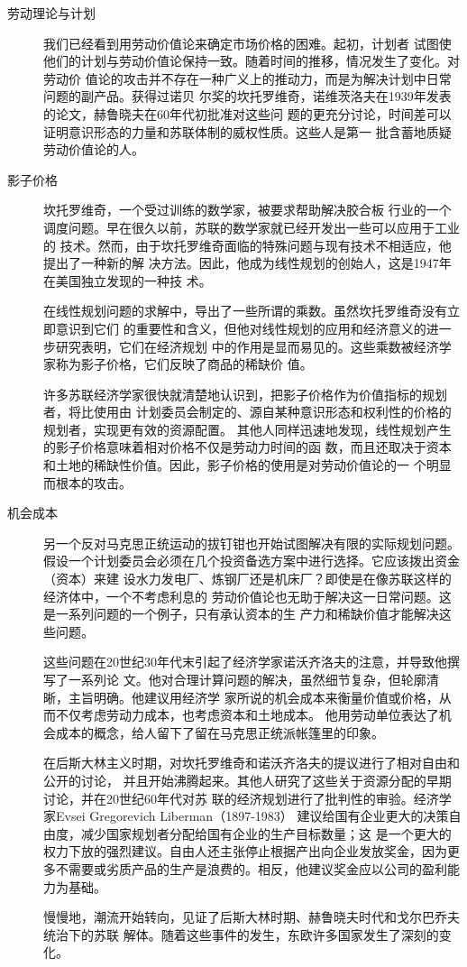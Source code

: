 \begin{description}
\item[劳动理论与计划] 我们已经看到用劳动价值论来确定市场价格的困难。起初，计划者
  试图使他们的计划与劳动价值论保持一致。随着时间的推移，情况发生了变化。对劳动价
  值论的攻击并不存在一种广义上的推动力，而是为解决计划中日常问题的副产品。获得过诺贝
  尔奖的坎托罗维奇，诺维茨洛夫在1939年发表的论文，赫鲁晓夫在60年代初批准对这些问
  题的更充分讨论，时间差可以证明意识形态的力量和苏联体制的威权性质。这些人是第一
  批含蓄地质疑劳动价值论的人。

\item[影子价格] 坎托罗维奇，一个受过训练的数学家，被要求帮助解决胶合板
  行业的一个调度问题。早在很久以前，苏联的数学家就已经开发出一些可以应用于工业的
  技术。然而，由于坎托罗维奇面临的特殊问题与现有技术不相适应，他提出了一种新的解
  决方法。因此，他成为线性规划的创始人，这是1947年在美国独立发现的一种技
  术。

  在线性规划问题的求解中，导出了一些所谓的乘数。虽然坎托罗维奇没有立即意识到它们
  的重要性和含义，但他对线性规划的应用和经济意义的进一步研究表明，它们在经济规划
  中的作用是显而易见的。这些乘数被经济学家称为影子价格，它们反映了商品的稀缺价
  值。

  许多苏联经济学家很快就清楚地认识到，把影子价格作为价值指标的规划者，将比使用由
  计划委员会制定的、源自某种意识形态和权利性的价格的规划者，实现更有效的资源配置。
  其他人同样迅速地发现，线性规划产生的影子价格意味着相对价格不仅是劳动力时间的函
  数，而且还取决于资本和土地的稀缺性价值。因此，影子价格的使用是对劳动价值论的一
  个明显而根本的攻击。

\item[机会成本] 另一个反对马克思正统运动的拔钉钳也开始试图解决有限的实际规划问题。
  假设一个计划委员会必须在几个投资备选方案中进行选择。它应该拨出资金（资本）来建
  设水力发电厂、炼钢厂还是机床厂？即使是在像苏联这样的经济体中，一个不考虑利息的
  劳动价值论也无助于解决这一日常问题。这是一系列问题的一个例子，只有承认资本的生
  产力和稀缺价值才能解决这些问题。

  这些问题在20世纪30年代末引起了经济学家诺沃齐洛夫的注意，并导致他撰写了一系列论
  文。他对合理计算问题的解决，虽然细节复杂，但轮廓清晰，主旨明确。他建议用经济学
  家所说的机会成本来衡量价值或价格，从而不仅考虑劳动力成本，也考虑资本和土地成本。
  他用劳动单位表达了机会成本的概念，给人留下了留在马克思正统派帐篷里的印象。

  在后斯大林主义时期，对坎托罗维奇和诺沃齐洛夫的提议进行了相对自由和公开的讨论，
  并且开始沸腾起来。其他人研究了这些关于资源分配的早期讨论，并在20世纪60年代对苏
  联的经济规划进行了批判性的审验。经济学家Evsei Gregorevich Liberman（1897-1983）
  建议给国有企业更大的决策自由度，减少国家规划者分配给国有企业的生产目标数量；这
  是一个更大的权力下放的强烈建议。自由人还主张停止根据产出向企业发放奖金，因为更
  多不需要或劣质产品的生产是浪费的。相反，他建议奖金应以公司的盈利能力为基础。

  慢慢地，潮流开始转向，见证了后斯大林时期、赫鲁晓夫时代和戈尔巴乔夫统治下的苏联
  解体。随着这些事件的发生，东欧许多国家发生了深刻的变化。
\end{description}

